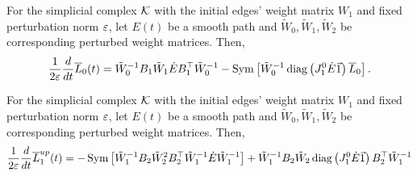   
  \begin{lemma}
    \label{lem:eigderL0} 
    For the simplicial complex $\mathcal{K}$ with the initial edges' weight matrix $W_1$ and  fixed perturbation norm $\varepsilon$, let $E(t)$ be a smooth path and $\tilde W_0, \tilde W_1, \tilde W_2$ be corresponding perturbed weight matrices. Then,
    \begin{equation}
      \frac{1}{2\varepsilon} \frac{d}{dt} \overline{L}_0 (t)  = \tilde W_0^{-1}  B_1 \tilde W_1 \dot E  B_1^\top \tilde W_0^{-1}-\operatorname{Sym}\left[ \tilde W_0^{-1} \operatorname{diag} \left(  J_1^0 \dot E \vec 1 \right)  \overline{L}_0 \right]. 
    \end{equation}
  \end{lemma}
  
  \begin{lemma}
    \label{lem:eigderL1}
    For the simplicial complex $\mathcal{K}$ with the initial edges' weight matrix $W_1$ and fixed perturbation norm $\varepsilon$,  let $E(t)$ be a smooth path and $\tilde W_0, \tilde W_1, \tilde W_2$ be corresponding perturbed weight matrices.  Then, 
    \begin{equation*}
     \frac{1}{2\varepsilon} \frac{d}{dt} \overline{L}^{up}_1 (t)  =   - \operatorname{Sym} \left[ \tilde W_1^{-1} B_2 \tilde W_2^2 B_2^\top \tilde W_1^{-1} \dot E \tilde W_1^{-1} \right] 
   + \tilde W_1^{-1} B_2 \tilde W_2 \operatorname{diag}\left(  J_1^0 \dot E \vec 1  \right) B_2^\top \tilde W_1^{-1}
    \end{equation*}
  \end{lemma}
  
